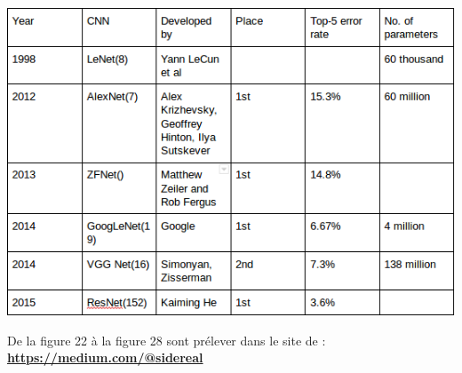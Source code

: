 \begin{center}
	\includegraphics[scale=0.5]{img32.png}
\end{center}
De la figure 22 à la figure 28 sont prélever dans le  site de :\\
\textbf{\href{https://medium.com/@sidereal}{https://medium.com/@sidereal}}